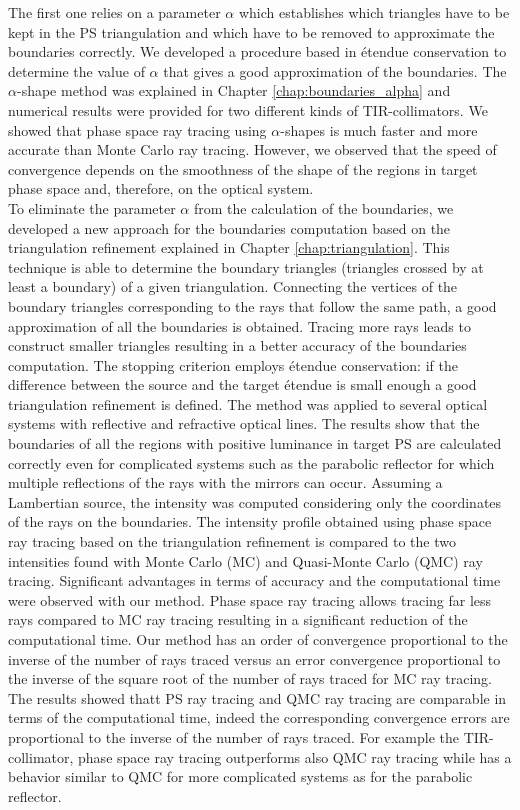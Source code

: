 The first one relies on a parameter $\alpha$ which establishes which triangles have to be kept in the PS triangulation and which have to be removed to approximate the boundaries correctly. We developed a procedure based in \'{e}tendue conservation to determine the value of $\alpha$ that gives a good approximation of the boundaries.
The $\alpha$-shape method was explained in Chapter \ref{chap:boundaries_alpha} and numerical results were provided for two different kinds of TIR-collimators. We showed that phase space ray tracing using $\alpha$-shapes is much faster and more accurate than Monte Carlo ray tracing. However, we observed that the speed of convergence depends on the smoothness of the shape of the regions in target phase space and, therefore, on the optical system. \\ \indent To eliminate the parameter $\alpha$ from the calculation of the boundaries, we developed a new approach for the boundaries computation based on the triangulation refinement explained in Chapter \ref{chap:triangulation}. This technique is able to determine the boundary triangles (triangles crossed by at least a boundary) of a given triangulation. Connecting the vertices of the boundary triangles corresponding to the rays that follow the same path, a good approximation of all the boundaries is obtained. Tracing more rays leads to construct smaller triangles resulting in a better accuracy of the boundaries computation. The stopping criterion employs \'{e}tendue conservation: if the difference between the source and the target \'{e}tendue is small enough a good triangulation refinement is defined. 
The method was applied to several optical systems with reflective and refractive optical lines. The results show that the boundaries of all the regions with positive luminance in target PS are calculated correctly even for complicated systems such as the parabolic reflector for which multiple reflections of the rays with the mirrors can occur. Assuming a Lambertian source, the intensity was computed considering only the coordinates of the rays on the boundaries. 
The intensity profile obtained using phase space ray tracing based on the triangulation refinement is compared to the two intensities found with Monte Carlo (MC) and Quasi-Monte Carlo (QMC) ray tracing. Significant advantages in terms of accuracy and the computational time were observed with our method. Phase space ray tracing allows tracing far less rays compared to MC ray tracing resulting in a significant reduction of the computational time. Our method has an order of convergence proportional to the inverse of the number of rays traced versus an error convergence proportional to the inverse of the square root of the number of rays traced for MC ray tracing. The results showed thatt PS ray tracing and QMC ray tracing are comparable in terms of the computational time, indeed the corresponding convergence errors are proportional to the inverse of the number of rays traced. For example the TIR-collimator, phase space ray tracing outperforms also QMC ray tracing while has a behavior similar to QMC for more complicated systems as for the parabolic reflector.
